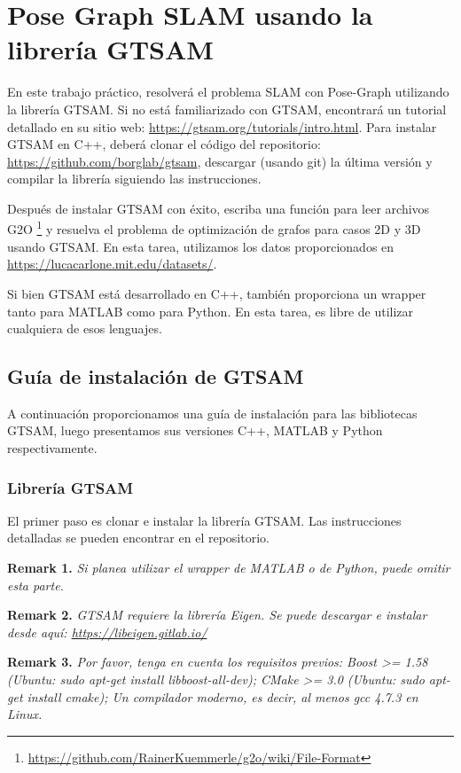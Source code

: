 \documentclass[tp]{lcc}
\begin{document}
\section*{Pose Graph SLAM usando la librería GTSAM}
%
En este trabajo práctico, resolverá el problema SLAM con Pose-Graph utilizando la librería GTSAM. Si no está familiarizado con GTSAM, encontrará un tutorial detallado en su sitio web: \url{https://gtsam.org/tutorials/intro.html}. Para instalar GTSAM en C++, deberá clonar el código del repositorio: \url{https://github.com/borglab/gtsam}, descargar (usando git) la última versión y compilar la librería siguiendo las instrucciones.

Después de instalar GTSAM con éxito, escriba una función para leer archivos G2O \footnote{\url{https://github.com/RainerKuemmerle/g2o/wiki/File-Format}} y resuelva el problema de optimización de grafos para casos 2D y 3D usando GTSAM. En esta tarea, utilizamos los datos proporcionados en \url{https://lucacarlone.mit.edu/datasets/}.

Si bien GTSAM está desarrollado en C++, también proporciona un wrapper tanto para MATLAB como para Python. En esta tarea, es libre de utilizar cualquiera de esos lenguajes.

\subsection*{Guía de instalación de GTSAM}
A continuación proporcionamos una guía de instalación para las bibliotecas GTSAM, luego presentamos sus versiones C++, MATLAB y Python respectivamente.

\subsubsection*{Librería GTSAM}
El primer paso es clonar e instalar la librería GTSAM. Las instrucciones detalladas se pueden encontrar en el repositorio.

\textbf{Remark 1.} \textit{Si planea utilizar el wrapper de MATLAB o de Python, puede omitir esta parte.}

\textbf{Remark 2.} \textit{GTSAM requiere la librería Eigen. Se puede descargar e instalar desde aquí: \url{https://libeigen.gitlab.io/}}

\textbf{Remark 3.} \textit{Por favor, tenga en cuenta los requisitos previos: Boost >= 1.58 (Ubuntu: sudo apt-get install libboost-all-dev); CMake >= 3.0 (Ubuntu: sudo apt-get install cmake); Un compilador moderno, es decir, al menos gcc 4.7.3 en Linux.}
\end{document}
